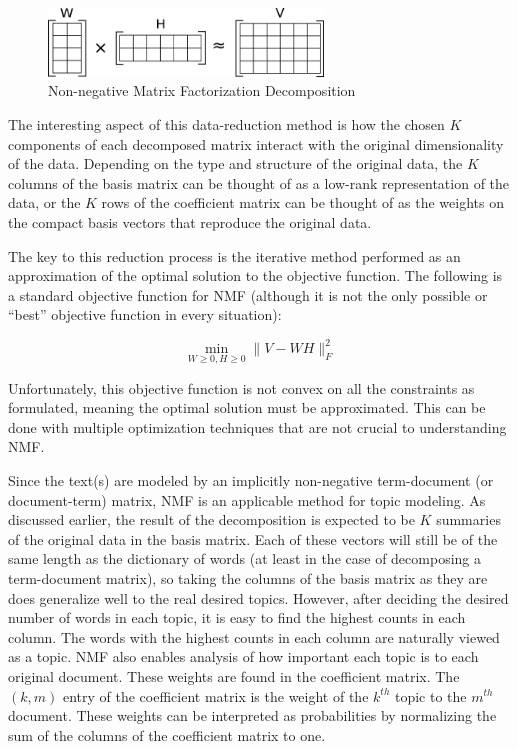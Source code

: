 \documentclass[10pt]{article}
\begin{document}
\begin{figure}[H]
\centering
\includegraphics[width=0.65\textwidth, keepaspectratio]{NMF-2}
\caption{Non-negative Matrix Factorization Decomposition \cite{nmf-pic}}
\label{nmf-fig}
\end{figure}

The interesting aspect of this data-reduction method is how the chosen $K$ components of each decomposed matrix interact with the original dimensionality of the data.  Depending on the type and structure of the original data, the $K$ columns of the basis matrix can be thought of as a low-rank representation of the data, or the $K$ rows of the coefficient matrix can be thought of as the weights on the compact basis vectors that reproduce the original data.

The key to this reduction process is the iterative method performed as an approximation of the optimal solution to the objective function.  The following is a standard objective function for NMF (although it is not the only possible or “best” objective function in every situation):

\begin{equation}
\label{NMF-eqn}
\min_{W\ge0,H\ge0} \|V-WH\|_{F}^{2}
\end{equation}

Unfortunately, this objective function is not convex on all the constraints as formulated, meaning the optimal solution must be approximated.  This can be done with multiple optimization techniques that are not crucial to understanding NMF.

Since the text(s) are modeled by an implicitly non-negative term-document (or document-term) matrix, NMF is an applicable method for topic modeling.  As discussed earlier, the result of the decomposition is expected to be $K$ summaries of the original data in the basis matrix.  Each of these vectors will still be of the same length as the dictionary of words (at least in the case of decomposing a term-document matrix), so taking the columns of the basis matrix as they are does generalize well to the real desired topics.  However, after deciding the desired number of words in each topic, it is easy to find the highest counts in each column.  The words with the highest counts in each column are naturally viewed as a topic.  NMF also enables analysis of how important each topic is to each original document.  These weights are found in the coefficient matrix.  The $(k,m)$ entry of the coefficient matrix is the weight of the $k^{th}$ topic to the $m^{th}$ document.  These weights can be interpreted as probabilities by normalizing the sum of the columns of the coefficient matrix to one.
\end{document}
